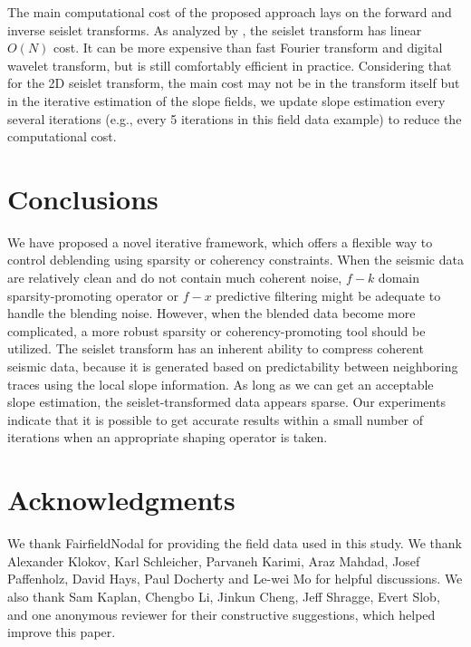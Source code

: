 The main computational cost of the proposed approach lays on the forward and inverse seislet transforms. As analyzed by \cite{seislet}, the seislet transform has linear $O(N)$ cost. It can be more expensive than fast Fourier transform and digital wavelet transform, but is still comfortably efficient in practice. Considering that for the 2D seislet transform, the main cost may not be in the transform itself but in the iterative estimation of the slope fields, we update slope estimation every several iterations (e.g., every 5 iterations in this field data example) to reduce the computational cost.


\section{Conclusions}
We have proposed a novel iterative framework, which offers a flexible way to control deblending using sparsity or coherency constraints.  
When the seismic data are relatively clean and do not contain much coherent noise, $f-k$ domain sparsity-promoting operator or $f-x$ predictive filtering might be adequate to handle the blending noise. However, when the blended data become more complicated, a more robust sparsity or coherency-promoting tool should be utilized. The seislet transform has an inherent ability to compress coherent seismic data, because it is generated based on predictability between neighboring traces using the local slope information. As long as we can get an acceptable slope estimation, the seislet-transformed data appears sparse.
Our experiments indicate that it is possible to get accurate results within a small number of iterations when an appropriate shaping operator is taken. 

\section{Acknowledgments}
We thank FairfieldNodal for providing the field data used in this study. We thank Alexander Klokov, Karl Schleicher, Parvaneh Karimi, Araz Mahdad, Josef Paffenholz, David Hays, Paul Docherty and Le-wei Mo for helpful discussions. We also thank Sam Kaplan, Chengbo Li, Jinkun Cheng, Jeff Shragge, Evert Slob, and one anonymous reviewer for their constructive suggestions, which helped improve this paper. 

